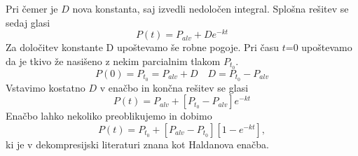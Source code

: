 \documentclass[a4paper]{article}
\begin{document}
Pri čemer je $D$ nova konstanta, saj izvedli nedoločen integral. 
Splošna rešitev se sedaj glasi 
\begin{equation}
P(t)=P_{alv}+De^{-kt}
\end{equation}
Za določitev konstante D upoštevamo še robne pogoje. Pri času $t$=0 upoštevamo da je tkivo že nasišeno z nekim parcialnim tlakom $P_{t_0}$.
\begin{equation} 
P(0)=P_{t_0}=P_{alv}+D \quad D=P_{t_0}-P_{alv}
\end{equation}
Vstavimo kostatno $D$ v enačbo  in končna rešitev se glasi
\begin{equation}
P(t)=P_{alv}+[P_{t_0}-P_{alv}]e^{-kt}
\end{equation}
Enačbo lahko nekoliko preoblikujemo in dobimo 
\begin{equation}
P(t)=P_{t_0}+[P_{alv}-P_{t_0}][1-e^{-kt}],
\end{equation}
ki je v dekompresijski literaturi znana kot Haldanova enačba. 
\end{document}
